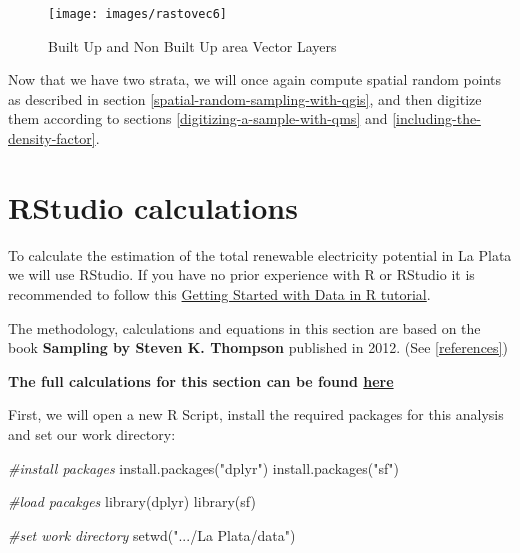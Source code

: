 \documentclass[
]{book}
\newenvironment{Shaded}{\begin{snugshade}}{\end{snugshade}}
\newcommand{\CommentTok}[1]{\textcolor[rgb]{0.56,0.35,0.01}{\textit{#1}}}
\newcommand{\FunctionTok}[1]{\textcolor[rgb]{0.00,0.00,0.00}{#1}}
\newcommand{\NormalTok}[1]{#1}
\newcommand{\StringTok}[1]{\textcolor[rgb]{0.31,0.60,0.02}{#1}}
\begin{document}
\begin{figure}

{\centering \texttt{[image: images/rastovec6]} 

}

\caption{Built Up and Non Built Up area Vector Layers}\label{fig:img-227}
\end{figure}

Now that we have two strata, we will once again compute spatial random points as described in section \ref{spatial-random-sampling-with-qgis}, and then digitize them according to sections \ref{digitizing-a-sample-with-qms} and \ref{including-the-density-factor}.

\hypertarget{rstudio-calculations}{%
\section{RStudio calculations}\label{rstudio-calculations}}

To calculate the estimation of the total renewable electricity potential in La Plata we will use RStudio. If you have no prior experience with R or RStudio it is recommended to follow this \href{https://moderndive.com/1-getting-started.html}{Getting Started with Data in R tutorial}.

The methodology, calculations and equations in this section are based on the book \textbf{Sampling by Steven K. Thompson} published in 2012. (See \ref{references})

\textbf{The full calculations for this section can be found \href{https://bookdown.org/einavg7/laplata_sampling/laplata_sampling.html}{here}}

First, we will open a new R Script, install the required packages for this analysis and set our work directory:

\begin{Shaded}
\begin{Highlighting}[]
\CommentTok{\#install packages}
\FunctionTok{install.packages}\NormalTok{(}\StringTok{"dplyr"}\NormalTok{)}
\FunctionTok{install.packages}\NormalTok{(}\StringTok{"sf"}\NormalTok{)}

\CommentTok{\#load pacakges}
\FunctionTok{library}\NormalTok{(dplyr)}
\FunctionTok{library}\NormalTok{(sf)}

\CommentTok{\#set work directory}
\FunctionTok{setwd}\NormalTok{(}\StringTok{".../La Plata/data"}\NormalTok{)}
\end{Highlighting}
\end{Shaded}
\end{document}
